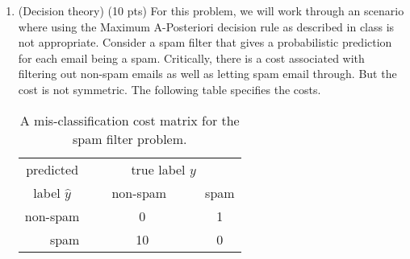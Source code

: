 \documentclass{article}
\begin{document}
\begin{enumerate}
 \begin{enumerate}
    \item (3pts) Write down the log likelihood function of $\mathbf{w}$ under this new modeling assumption.\\
    \item (1pts) Show that maximizing the log likelihood is equivalent to minimizing a \textbf{weighted square loss function} $J(\mathbf{W}) = \sum_{i=1}^na_i(\mathbf{w}^T\mathbf{x}_i-y_i)^2$, and express each $a_i$ in terms of $\sigma_i$.\\
    \item (3 pts) Derive a batch gradient descent update rule for optimizing this objective.\\
    \item (3 pts) Derive a closed form solution to this optimization problem. Hint: begin by rewrite the objective into matrix form using a diagonal matrix $A$ with $A(i,i)=a_i$.\\
\end{enumerate}

\item (Decision theory) (10 pts) For this problem, we will work through an scenario where using the Maximum A-Posteriori decision rule as described in class is not appropriate.  Consider a spam filter that gives a probabilistic prediction for each email being a spam.  Critically, there is a cost associated with filtering out non-spam emails as well as letting spam email through. But the cost is not symmetric. The following table specifies the costs. 
\begin{table}[h]
    \centering
 \begin{tabular}{|r|c|c|}\hline
  \multicolumn{1}{|c|}{predicted} & \multicolumn{2}{c|}{true label $y$}\\ \cline{2-3}
 \multicolumn{1}{|c|}{label $\hat{y}$} & \ \ \ non-spam\ \ \ \   & spam \\ \hline
 non-spam     & 0 & 1 \\ \hline
 spam     & 10 &  0 \\ \hline
 \end{tabular}
    \caption{A mis-classification cost matrix for the spam filter problem.}
    \label{tab:my_label}
\end{table}
\begin{center}


\end{center}
\end{enumerate}
\end{document}
